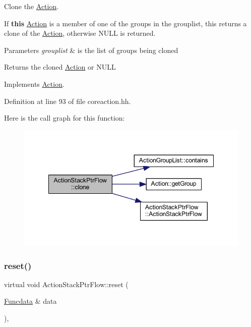 Clone the \mbox{\hyperlink{class_action}{Action}}. 

If {\bfseries{this}} \mbox{\hyperlink{class_action}{Action}} is a member of one of the groups in the grouplist, this returns a clone of the \mbox{\hyperlink{class_action}{Action}}, otherwise N\+U\+LL is returned. 
\begin{DoxyParams}{Parameters}
{\em grouplist} & is the list of groups being cloned \\
\hline
\end{DoxyParams}
\begin{DoxyReturn}{Returns}
the cloned \mbox{\hyperlink{class_action}{Action}} or N\+U\+LL 
\end{DoxyReturn}


Implements \mbox{\hyperlink{class_action_af8242e41d09e5df52f97df9e65cc626f}{Action}}.



Definition at line 93 of file coreaction.\+hh.

Here is the call graph for this function\+:
\nopagebreak
\begin{figure}[H]
\begin{center}
\leavevmode
\includegraphics[width=348pt]{class_action_stack_ptr_flow_a82a95a85172576abdfa446a3faed3ff4_cgraph}
\end{center}
\end{figure}
\mbox{\label{class_action_stack_ptr_flow_a2baae3d78de2308e628b17ed3db8a625}} 
\subsubsection{\texorpdfstring{reset()}{reset()}}
{\footnotesize\ttfamily virtual void Action\+Stack\+Ptr\+Flow\+::reset (\begin{DoxyParamCaption}\item[{\mbox{\hyperlink{class_funcdata}{Funcdata}} \&}]{data }\end{DoxyParamCaption})\hspace{0.3cm}{\ttfamily [inline]}, {\ttfamily [virtual]}}



